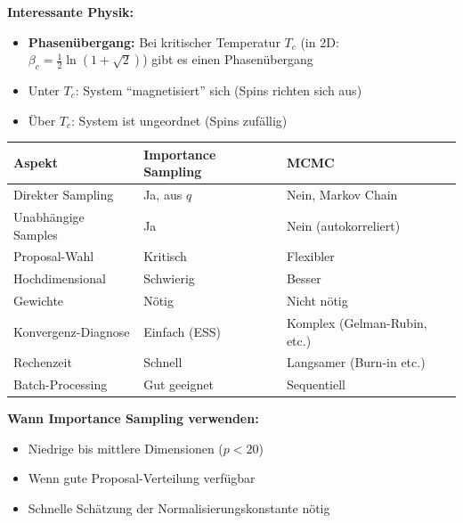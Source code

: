 \textbf{Interessante Physik:}
\begin{itemize}[leftmargin=1.5em]
    \item \textbf{Phasenübergang:} Bei kritischer Temperatur $T_c$ (in 2D: $\beta_c = \frac{1}{2}\ln(1+\sqrt{2})$) gibt es einen Phasenübergang
    \item Unter $T_c$: System ``magnetisiert'' sich (Spins richten sich aus)
    \item Über $T_c$: System ist ungeordnet (Spins zufällig)
\end{itemize}


\begin{table}[h]
    \centering
    \small
    \begin{tabular}{|l|l|l|}
        \hline
        \textbf{Aspekt} & \textbf{Importance Sampling} & \textbf{MCMC} \\
        \hline
        Direkter Sampling & Ja, aus $q$ & Nein, Markov Chain \\
        \hline
        Unabhängige Samples & Ja & Nein (autokorreliert) \\
        \hline
        Proposal-Wahl & Kritisch & Flexibler \\
        \hline
        Hochdimensional & Schwierig & Besser \\
        \hline
        Gewichte & Nötig & Nicht nötig \\
        \hline
        Konvergenz-Diagnose & Einfach (ESS) & Komplex (Gelman-Rubin, etc.) \\
        \hline
        Rechenzeit & Schnell & Langsamer (Burn-in etc.) \\
        \hline
        Batch-Processing & Gut geeignet & Sequentiell \\
        \hline
    \end{tabular}
\end{table}


\textbf{Wann Importance Sampling verwenden:}
\begin{itemize}[leftmargin=1.5em]
    \item Niedrige bis mittlere Dimensionen ($p < 20$)
    \item Wenn gute Proposal-Verteilung verfügbar
    \item Schnelle Schätzung der Normalisierungskonstante nötig
\end{itemize}

